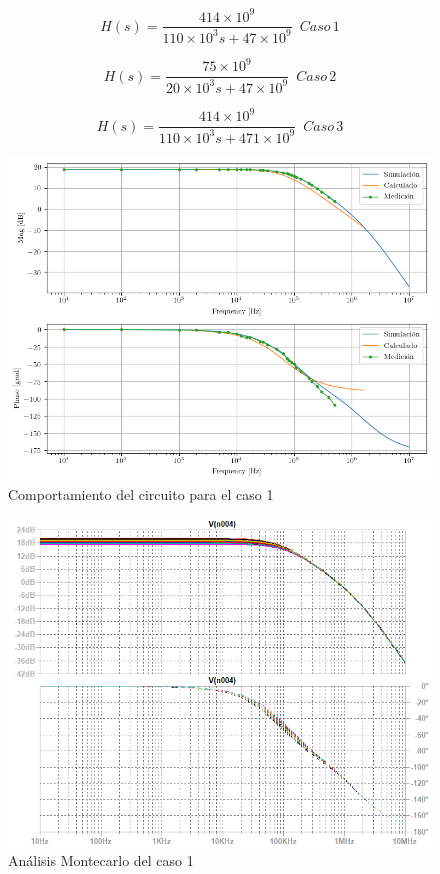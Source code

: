\[
H(s)=\frac{414\times10^{9}}{110\times10^{3}s+47\times10^{9}}\,\,\,Caso\,1
\]

\[
H(s)=\frac{75\times10^{9}}{20\times10^{3}s+47\times10^{9}}\,\,\,Caso\,2
\]

\[
H(s)=\frac{414\times10^{9}}{110\times10^{3}s+471\times10^{9}}\,\,\,Caso\,3
\]

\begin{figure}[H]
\begin{centering}
\includegraphics[scale=0.5]{../Ex1/ib/Resources1b/H1b}
\par\end{centering}
\caption{Comportamiento del circuito para el caso 1}
\end{figure}

\begin{figure}[H]
\begin{centering}
\includegraphics[scale=0.5]{../Ex1/ib/Resources1b/Montecarlo1}
\par\end{centering}
\caption{Análisis Montecarlo del caso 1}
\end{figure}

